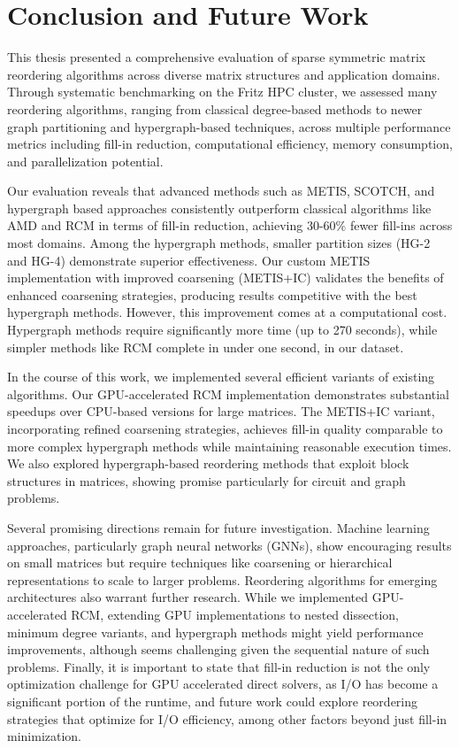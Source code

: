 \chapter{Conclusion and Future Work}
\label{ch:conclusion}

This thesis presented a comprehensive evaluation of sparse symmetric matrix reordering algorithms across diverse matrix structures and application domains. Through systematic benchmarking on the Fritz HPC cluster, we assessed many reordering algorithms, ranging from classical degree-based methods to newer graph partitioning and hypergraph-based techniques, across multiple performance metrics including fill-in reduction, computational efficiency, memory consumption, and parallelization potential.

Our evaluation reveals that advanced methods such as METIS, SCOTCH, and hypergraph based approaches consistently outperform classical algorithms like AMD and RCM in terms of fill-in reduction, achieving 30-60\% fewer fill-ins across most domains. Among the hypergraph methods, smaller partition sizes (HG-2 and HG-4) demonstrate superior effectiveness. Our custom METIS implementation with improved coarsening (METIS+IC) validates the benefits of enhanced coarsening strategies, producing results competitive with the best hypergraph methods. However, this improvement comes at a computational cost. Hypergraph methods require significantly more time (up to 270 seconds), while simpler methods like RCM complete in under one second, in our dataset.

In the course of this work, we implemented several efficient variants of existing algorithms. Our GPU-accelerated RCM implementation demonstrates substantial speedups over CPU-based versions for large matrices. The METIS+IC variant, incorporating refined coarsening strategies, achieves fill-in quality comparable to more complex hypergraph methods while maintaining reasonable execution times. We also explored hypergraph-based reordering methods that exploit block structures in matrices, showing promise particularly for circuit and graph problems. 


Several promising directions remain for future investigation. Machine learning approaches, particularly graph neural networks (GNNs), show encouraging results on small matrices but require techniques like coarsening or hierarchical representations to scale to larger problems. Reordering algorithms for emerging architectures also warrant further research. While we implemented GPU-accelerated RCM, extending GPU implementations to nested dissection, minimum degree variants, and hypergraph methods might yield performance improvements, although seems challenging given the sequential nature of such problems. Finally, it is important to state that fill-in reduction is not the only optimization challenge for GPU accelerated direct solvers, as I/O has become a significant portion of the runtime, and future work could explore reordering strategies that optimize for I/O efficiency, among other factors beyond just fill-in minimization.


